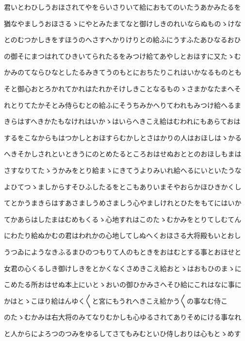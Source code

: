 \documentclass[a4paper,11pt,landscape]{ltjtarticle}
\begin{document}
君いとわひしうおほされてやをらいさりいて給におもてのいたうあかみたるを
\par\medskip
猶なやましうおほさるゝにやとみたまてなと御けしきのれいならぬものゝけな
\par\medskip
とのむつかしきをすほうのへさすへかりけりとの給ふにうすふたあひなるおひ
\par\medskip
の御そにまつはれてひきいてられたるをみつけ給てあやしとおほすに又たゝむ
\par\medskip
かみのてならひなとしたるみきてうのもとにおちたりこれはいかなるものとも
\par\medskip
そと御心おとろかれてかれはたれかそけしきことなるものゝさまかなたまへそ
\par\medskip
れとりてたかそとみ侍らむとの給ふにそうちみかへりてわれもみつけ給へるま
\par\medskip
きらはすへきかたもなけれはいかゝはいらへきこえ給はむわれにもあらておは
\par\medskip
するをこなからもはつかしとおほすらむかしとさはかりの人はおほしはゝかる
\par\medskip
へきそかしされといときうにのとめたるところおはせぬおととのおほしもまは
\par\medskip
さすなりてたゝうかみをとり給まゝにきてうよりみいれ給へるにいといたうな
\par\medskip
よひてつゝましからすそひふしたるをとこもありいまそやおらかほひきかくし
\par\medskip
てとかうまきらはすあさましうめさましう心やましけれとひたをもてにはいか
\par\medskip
てかあらはしたまはむめもくるゝ心地すれはこのたゝむかみをとりてしむてん
\par\medskip
にわたり給ぬかむの君はわれかの心地してしぬへくおほさる大将殿もいとおし
\par\medskip
うつゐにようなきふるまひのつもりて人のもときをおはむとする事とおほせと
\par\medskip
女君の心くるしき御けしきをとかくなくさめきこえ給おとゝはおもひのまゝに
\par\medskip
こめたる所おはせぬ本上にいとゝおいの御ひかみさへそひ給にこれはなに事に
\par\medskip
かはとゝこほり給はんゆく〱と宮にもうれへきこえ給かう〱の事なむ侍こ
\par\medskip
のたゝむかみは右大将のみてなりむかしも心ゆるされてありそめにける事なれ
\par\medskip
と人からによろつのつみをゆるしてさてもみむといひ侍しおりは心もとゝめす
\par\medskip
\end{document}
